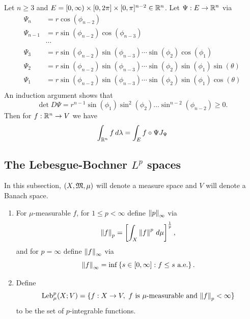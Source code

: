 \documentclass[a4paper]{article}
\begin{document}
\begin{eg}
  Let $n \geq 3$ and $E = [0, \infty) \times [0, 2 \pi]
    \times [0, \pi]^{n-2} \in \mathbb{R}^n$. Let $\Psi: E \to \mathbb{R}^n$
  via
  \[
    \begin{aligned}
      \Psi_n     & = r \cos (\phi_{n-2})                                        \\
      \Psi_{n-1} & = r \sin (\phi_{n-2}) \cos (\phi_{n-3})                      \\
                 & \cdots                                                       \\
      \Psi_3     & = r \sin (\phi_{n-2}) \sin (\phi_{n-3}) \cdots \sin (\phi_2)
      \cos (\phi_1)                                                             \\
      \Psi_2     & = r \sin (\phi_{n-2}) \sin (\phi_{n-3}) \cdots \sin (\phi_2)
      \sin (\phi_1) \sin (\theta)                                               \\
      \Psi_1     & = r \sin (\phi_{n-2}) \sin (\phi_{n-3}) \cdots \sin (\phi_2)
      \sin (\phi_1) \cos (\theta)                                               \\
    \end{aligned}
  \]
  An induction argument shows that
  \[
    \det D\Psi = r^{n-1} \sin (\phi_1) \sin^2 (\phi_2)
    \dots \sin^{n-2} (\phi_{n-2}) \geq 0.
  \]
  Then for $f : \mathbb{R}^n \to V$ we have
  \[
    \int_{\mathbb{R}^n} f \, d \lambda = \int_E f \circ \Psi J_{\Psi}
  \]
\end{eg}

\subsection{The Lebesgue-Bochner $L^p$ spaces}

In this subsection, $(X, \mathfrak{M}, \mu)$ will denote a measure space and $V$
will denote a Banach space.

\begin{defi}
  \begin{enumerate}
    \item For $\mu$-measurable $f$, for $1 \leq p < \infty$ define
          $\left\lVert p\right\rVert_\infty$ via
          \[
            \left\lVert f\right\rVert_p = \left[ \int_X \left\lVert f\right\rVert^p \, d \mu \right]^{\frac{1}{p}},
          \]
          and for $p = \infty$ define $\left\lVert f\right\rVert_\infty$ via
          \[
            \left\lVert f\right\rVert_\infty = \inf \left\{ s \in [0, \infty] : f
            \leq s \text{ a.e.} \right\}.
          \]

    \item Define
          \[
            \operatorname{Leb}_\mu^p (X; V) = \{ f : X \to V, \text{ $f$ is $\mu$-measurable
            and $\left\lVert f\right\rVert_p < \infty$} \}
          \]
          to be the set of $p$-integrable functions.
  \end{enumerate}
\end{defi}
\end{document}
